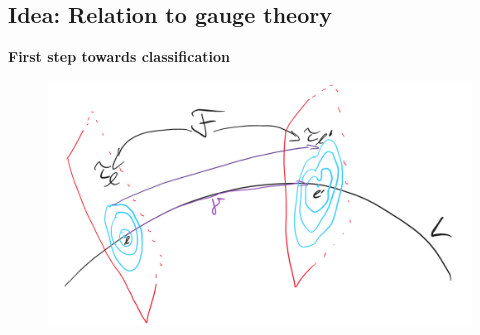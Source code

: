 \documentclass[hyperref={pdfpagelabels=false}]{beamer}
\newcommand\insertreferences{}
\theoremstyle{plain}
\theoremstyle{remark}
\begin{document}
\subsection{Idea: Relation to gauge theory}


{
\begin{frame}
\thispagestyle{empty}
\begin{center}
\textbf{\Large First step towards classification}
\end{center}
\end{frame}
}

\renewcommand\insertreferences{{\tiny Camille Laurent-Gengoux and Leonid Ryvkin, The holonomy of a singular leaf, \newline \textit{Selecta Mathematica 28}, no.\ 2, 45, 2022.}}

\begin{frame}
\begin{figure}[htbp]
	\centering
		\includegraphics[width=1.00\textwidth]{Foliation connection.png}
	\label{fig:Foliationconnection}
\end{figure}

\end{frame}
\end{document}
